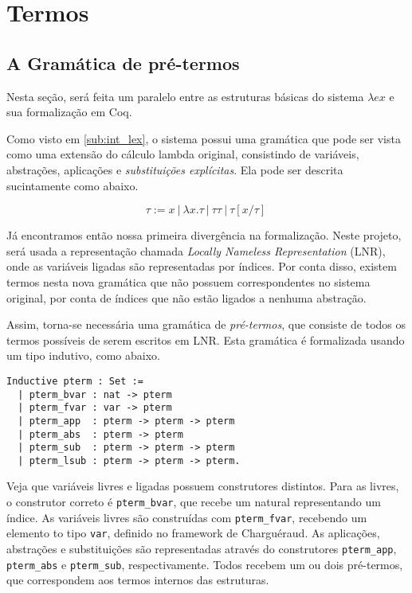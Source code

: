\section{Termos}
\subsection{A Gramática de pré-termos}
\label{sec:termos}

Nesta seção, será feita um paralelo entre as estruturas básicas do sistema
$\lambda ex$ e sua formalização em Coq.

Como visto em \ref{sub:int_lex}, o sistema possui uma gramática que pode ser vista como
uma extensão do cálculo lambda original, consistindo de variáveis, abstrações,
aplicações e \emph{substituições explícitas}. Ela pode ser descrita sucintamente
como abaixo.

\[ \tau := x\ |\ \lambda x.\tau\ |\ \tau \tau\ |\ \tau[x/\tau]\ \]

Já encontramos então nossa primeira divergência na formalização. Neste projeto,
será usada a representação chamada \textit{Locally Nameless Representation}
(LNR), onde as variáveis ligadas são representadas por índices. Por conta disso,
existem termos nesta nova gramática que não possuem correspondentes no sistema
original, por conta de índices que não estão ligados a nenhuma abstração.

Assim, torna-se necessária uma gramática de \emph{pré-termos}, que consiste de
todos os termos possíveis de serem escritos em LNR. Esta gramática é formalizada
usando um tipo indutivo, como abaixo.

\begin{lstlisting}[basicstyle=\small]
Inductive pterm : Set :=
  | pterm_bvar : nat -> pterm
  | pterm_fvar : var -> pterm
  | pterm_app  : pterm -> pterm -> pterm
  | pterm_abs  : pterm -> pterm
  | pterm_sub  : pterm -> pterm -> pterm 
  | pterm_lsub : pterm -> pterm -> pterm.
\end{lstlisting}

Veja que variáveis livres e ligadas possuem construtores distintos. Para as
livres, o construtor correto é \texttt{pterm\_bvar}, que recebe um natural
representando um índice. As variáveis livres são construídas com
\texttt{pterm\_fvar}, recebendo um elemento to tipo \texttt{var}, definido no
framework de Charguéraud.
As aplicações, abstrações e substituições são representadas através do
construtores \texttt{pterm\_app}, \texttt{pterm\_abs} e \texttt{pterm\_sub},
respectivamente. Todos recebem um ou dois pré-termos, que correspondem aos
termos internos das estruturas.

